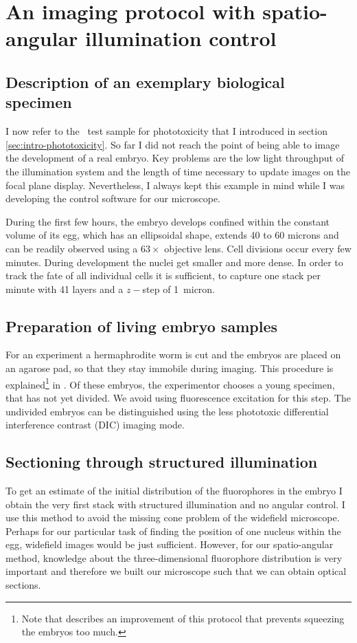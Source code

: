 \section{An imaging protocol with spatio-angular illumination control}
\subsection{Description of an exemplary biological specimen} 
I now refer to the \celegans\ test sample for phototoxicity that I
introduced in section \ref{sec:intro-phototoxicity}. So far I did not
reach the point of being able to image the development of a real
embryo. Key problems are the low light throughput of the illumination
system and the length of time necessary to update images on the focal
plane display. Nevertheless, I always kept this example in mind while
I was developing the control software for our microscope.

During the first few hours, the embryo develops confined within the
constant volume of its egg, which has an ellipsoidal shape, extends 40
to 60 microns and can be readily observed using a $63\times$ objective
lens. Cell divisions occur every few minutes.  During development the
nuclei get smaller and more dense. In order to track the fate of all
individual cells it is sufficient, to capture one stack per minute
with 41 layers and a $z-$step of 1~micron.
\subsection{Preparation of living embryo samples} 
For an experiment a hermaphrodite worm is cut and the embryos are
placed on an agarose pad, so that they stay immobile during
imaging. This procedure is explained\footnote{Note that
  \cite{Murray2006} describes an improvement of this protocol that
  prevents squeezing the embryos too much.} in \cite{Hope1999}. Of
these embryos, the experimentor chooses a young specimen, that has not
yet divided. We avoid using fluorescence excitation for this step.
The undivided embryos can be distinguished using the less phototoxic
differential interference contrast (DIC) imaging mode.

\subsection{Sectioning through structured illumination} 
To get an estimate of the initial distribution of the fluorophores in
the embryo I obtain the very first stack with structured illumination
and no angular control. I use this method to avoid the missing cone
problem of the widefield microscope. Perhaps for our particular task
of finding the position of one nucleus within the egg, widefield
images would be just sufficient.  However, for our spatio-angular
method, knowledge about the three-dimensional fluorophore distribution is very important
and therefore we built our microscope such that we can obtain optical
sections.

